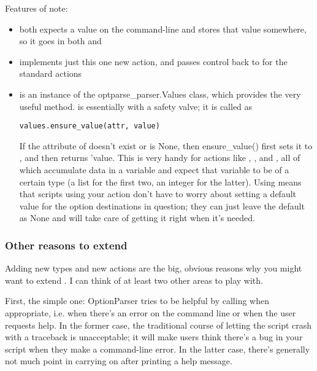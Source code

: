 Features of note:
\begin{itemize}
\item {} 
 both expects a value on the command-line and stores that
value somewhere, so it goes in both  and

\item {} 
 implements just this one new action, and
passes control back to  for the standard
 actions

\item {} 
 is an instance of the optparse{\_}parser.Values class,
which provides the very useful  method.
 is essentially  with a safety valve;
it is called as
\begin{verbatim}
values.ensure_value(attr, value)
\end{verbatim}

If the  attribute of  doesn't exist or is None, then
ensure{\_}value() first sets it to , and then returns 'value.
This is very handy for actions like , , and
, all of which accumulate data in a variable and expect that
variable to be of a certain type (a list for the first two, an integer
for the latter).  Using  means that scripts using
your action don't have to worry about setting a default value for the
option destinations in question; they can just leave the default as
None and  will take care of getting it right when
it's needed.

\end{itemize}


\subsubsection{Other reasons to extend \label{optparse-other-reasons-to-extend-optparse}}

Adding new types and new actions are the big, obvious reasons why you
might want to extend .  I can think of at least two other areas to
play with.

First, the simple one: OptionParser tries to be helpful by calling
 when appropriate, i.e. when there's an error on the
command line or when the user requests help.  In the former case, the
traditional course of letting the script crash with a traceback is
unacceptable; it will make users think there's a bug in your script when
they make a command-line error.  In the latter case, there's generally
not much point in carrying on after printing a help message.

